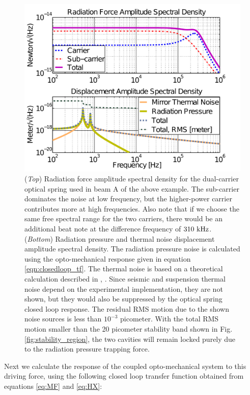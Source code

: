 \begin{figure}[htbp]
	\centering
		\includegraphics[width=15cm]{./figures/trap_radPresA_paper2.pdf}
	\caption[Radiation Force Amplitude Spectral Density]{(\emph{Top}) Radiation force amplitude spectral density for the dual-carrier optical spring used in beam A of the above example. The sub-carrier dominates the noise at low frequency, but the higher-power carrier contributes more at high frequencies. Also note that if we choose the same free spectral range for the two carriers, there would be an additional beat note at the difference frequency of $310~{\rm kHz}$. (\emph{Bottom})  Radiation pressure and thermal noise displacement amplitude spectral density. The radiation pressure noise is calculated using the opto-mechanical response given in equation \ref{eqn:closedloop_tf}. The thermal noise is based on a theoretical calculation described in \cite{Saulson90}, \cite{Ballmer13}. Since seismic and suspension thermal noise depend on the experimental implementation, they are not shown, but they would also be suppressed by the optical spring closed loop response. The residual RMS motion due to the shown noise sources is less than $10^{-3}$ picometer. With the total RMS motion smaller than the 20 picometer stability band shown in Fig.\ref{fig:stability_region}, the two cavities will remain locked purely due to the radiation pressure trapping force.}
	\label{fig:RFASD}
\end{figure}

Next we calculate the response of the coupled opto-mechanical system to this driving force, using the following closed loop transfer function obtained from equations \ref{eq:MF} and \ref{eq:HX}:

